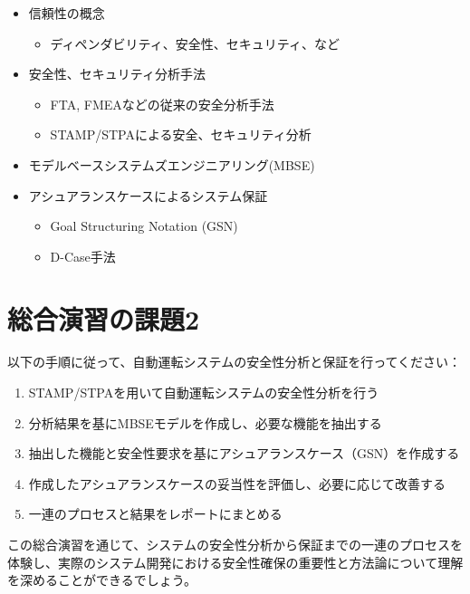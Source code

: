 \begin{itemize}
    \item 信頼性の概念
    \begin{itemize}
        \item ディペンダビリティ、安全性、セキュリティ、など
    \end{itemize}
    \item 安全性、セキュリティ分析手法
    \begin{itemize}
        \item FTA, FMEAなどの従来の安全分析手法
        \item STAMP/STPAによる安全、セキュリティ分析
    \end{itemize}
    \item モデルベースシステムズエンジニアリング(MBSE)
    \item アシュアランスケースによるシステム保証
    \begin{itemize}
        \item Goal Structuring Notation (GSN)
        \item D-Case手法
    \end{itemize}
\end{itemize}

\section{総合演習の課題2}

以下の手順に従って、自動運転システムの安全性分析と保証を行ってください：

\begin{enumerate}
    \item STAMP/STPAを用いて自動運転システムの安全性分析を行う
    \item 分析結果を基にMBSEモデルを作成し、必要な機能を抽出する
    \item 抽出した機能と安全性要求を基にアシュアランスケース（GSN）を作成する
    \item 作成したアシュアランスケースの妥当性を評価し、必要に応じて改善する
    \item 一連のプロセスと結果をレポートにまとめる
\end{enumerate}

この総合演習を通じて、システムの安全性分析から保証までの一連のプロセスを体験し、実際のシステム開発における安全性確保の重要性と方法論について理解を深めることができるでしょう。






